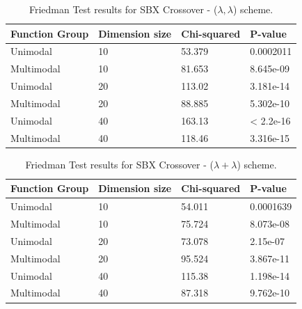 \begin{table}[h]
	\centering
	\begin{tabular}{|l|l|l|l|}
		\hline
		\textbf{Function Group} & \textbf{Dimension size}      & \textbf{Chi-squared}        & \textbf{P-value}                     \\ \hline
		\multicolumn{1}{|l|}{Unimodal} & \multicolumn{1}{|l|}{10} & \multicolumn{1}{l|}{53.379} & \multicolumn{1}{l|}{0.0002011} \\ \hline
		\multicolumn{1}{|l|}{Multimodal} & \multicolumn{1}{|l|}{10} & \multicolumn{1}{l|}{81.653} & \multicolumn{1}{l|}{8.645e-09}  \\ \hline
		\hline
		\multicolumn{1}{|l|}{Unimodal} & \multicolumn{1}{|l|}{20} & \multicolumn{1}{l|}{113.02} & \multicolumn{1}{l|}{3.181e-14} \\ \hline
		\multicolumn{1}{|l|}{Multimodal} & \multicolumn{1}{|l|}{20} & \multicolumn{1}{l|}{88.885} & \multicolumn{1}{l|}{5.302e-10}  \\ \hline
		\hline
		\multicolumn{1}{|l|}{Unimodal} & \multicolumn{1}{|l|}{40} & \multicolumn{1}{l|}{163.13} & \multicolumn{1}{l|}{< 2.2e-16} \\ \hline
		\multicolumn{1}{|l|}{Multimodal} & \multicolumn{1}{|l|}{40} & \multicolumn{1}{l|}{118.46} & \multicolumn{1}{l|}{3.316e-15}  \\ \hline
	\end{tabular}
	\caption{Friedman Test results for SBX Crossover - ($\lambda, \lambda$) scheme.}
	\label{Friedman_test_sbx-a}	
\end{table}

\begin{table}[h]
	\centering
	\begin{tabular}{|l|l|l|l|}
		\hline
		\textbf{Function Group} & \textbf{Dimension size}      & \textbf{Chi-squared}        & \textbf{P-value}                     \\ \hline
		\multicolumn{1}{|l|}{Unimodal} & \multicolumn{1}{|l|}{10} & \multicolumn{1}{l|}{54.011} & \multicolumn{1}{l|}{0.0001639} \\ \hline
		\multicolumn{1}{|l|}{Multimodal} & \multicolumn{1}{|l|}{10} & \multicolumn{1}{l|}{75.724} & \multicolumn{1}{l|}{8.073e-08}  \\ \hline
		\hline
		\multicolumn{1}{|l|}{Unimodal} & \multicolumn{1}{|l|}{20} & \multicolumn{1}{l|}{73.078} & \multicolumn{1}{l|}{2.15e-07} \\ \hline
		\multicolumn{1}{|l|}{Multimodal} & \multicolumn{1}{|l|}{20} & \multicolumn{1}{l|}{95.524} & \multicolumn{1}{l|}{3.867e-11}  \\ \hline
		\hline
		\multicolumn{1}{|l|}{Unimodal} & \multicolumn{1}{|l|}{40} & \multicolumn{1}{l|}{115.38} & \multicolumn{1}{l|}{1.198e-14} \\ \hline
		\multicolumn{1}{|l|}{Multimodal} & \multicolumn{1}{|l|}{40} & \multicolumn{1}{l|}{87.318} & \multicolumn{1}{l|}{9.762e-10}  \\ \hline
	\end{tabular}
	\caption{Friedman Test results for SBX Crossover - ($\lambda + \lambda$) scheme.}
	\label{Friedman_test_sbx-b}	
\end{table}




